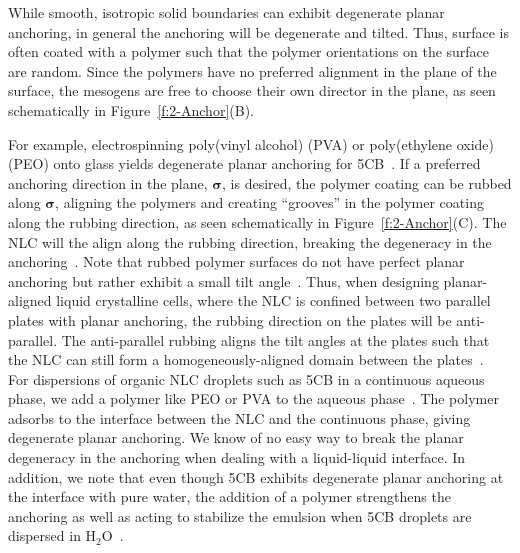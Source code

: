 While smooth, isotropic solid boundaries can exhibit degenerate planar anchoring, in general the anchoring will be degenerate and tilted.
Thus, surface is often coated with a polymer such that the polymer orientations on the surface are random.
Since the polymers have no preferred alignment in the plane of the surface, the mesogens are free to choose their own director in the plane, as seen schematically in Figure~\ref{f:2-Anchor}(B).

For example, electrospinning poly(vinyl alcohol) (PVA) or poly(ethylene oxide) (PEO) onto glass yields degenerate planar anchoring for 5CB~.
If a preferred anchoring direction in the plane, $\bm{\sigma}$, is desired, the polymer coating can be rubbed along $\bm{\sigma}$, aligning the polymers and creating ``grooves'' in the polymer coating along the rubbing direction, as seen schematically in Figure~\ref{f:2-Anchor}(C).
The NLC will the align along the rubbing direction, breaking the degeneracy in the anchoring~\cite{RN33,}.
Note that rubbed polymer surfaces do not have perfect planar anchoring but rather exhibit a small tilt angle~\cite{RN232}.
Thus, when designing planar-aligned liquid crystalline cells, where the NLC is confined between two parallel plates with planar anchoring, the rubbing direction on the plates will be anti-parallel.
The anti-parallel rubbing aligns the tilt angles at the plates such that the NLC can still form a homogeneously-aligned domain between the plates~\cite{RN232}. \\

For dispersions of organic NLC droplets such as 5CB in a continuous aqueous phase, we add a polymer like PEO or PVA to the aqueous phase~\cite{RN105,RN93}.
The polymer adsorbs to the interface between the NLC and the continuous phase, giving degenerate planar anchoring.
We know of no easy way to break the planar degeneracy in the anchoring when dealing with a liquid-liquid interface.
In addition, we note that even though 5CB exhibits degenerate planar anchoring at the interface with pure water, the addition of a polymer strengthens the anchoring as well as acting to stabilize the emulsion when 5CB droplets are dispersed in H$_2$O~\cite{RN105,RN93}.\\




